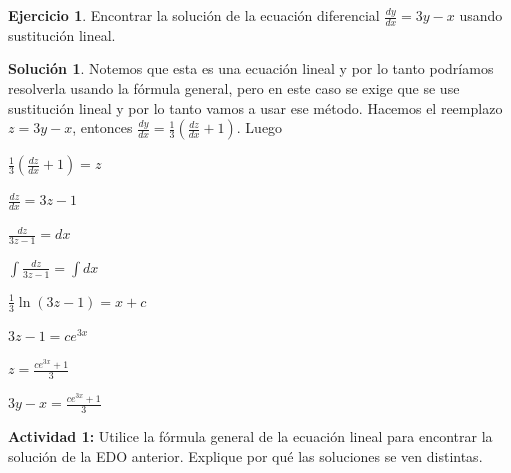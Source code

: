 \documentclass{article}
\theoremstyle{plain}
\theoremstyle{definition}
\newtheorem{ejer}[thm]{Ejercicio}
\newtheorem{sol}[thm]{Solución}
\begin{document}
\begin{ejer}Encontrar la solución de la ecuación diferencial $\displaystyle \frac{dy}{dx} =3y-x$ usando sustitución lineal.\\
\end{ejer}

\begin{sol}Notemos que esta es una ecuación lineal y por lo tanto podríamos resolverla usando la fórmula general, pero en este caso se exige que se use sustitución lineal y por lo tanto vamos a usar ese método. Hacemos el reemplazo $z = 3y-x$, entonces $\displaystyle \frac{dy}{dx} = \frac{1}{3}\left(  \frac{dz}{dx} +1 \right)  $. Luego
\end{sol}

\begin{center}
$\displaystyle \frac{1}{3} \left( \frac{dz}{dx} +1\right) =z$
\end{center}


\begin{center}
$\displaystyle \frac{dz}{dx} =3z-1$
\end{center}

\begin{center}
$\displaystyle \frac{dz}{3z-1} =dx$
\end{center}

\begin{center}
$\displaystyle \int \frac{dz}{3z-1} = \int dx$
\end{center}

\begin{center}
$\displaystyle \frac{1}{3} \ln(3z-1) = x+c$
\end{center}


\begin{center}
$\displaystyle 3z-1 = ce^{3x}$
\end{center}

\begin{center}
$\displaystyle z= \frac{ce^{3x}+1}{3}$
\end{center}


\begin{center}
$\displaystyle 3y-x= \frac{ce^{3x}+1}{3}$
\end{center}


\textbf{Actividad 1: } Utilice la fórmula general de la ecuación lineal para encontrar la solución de la EDO anterior. Explique por qué las soluciones se ven distintas. \\ \\
\end{document}
